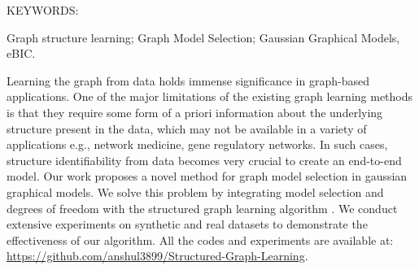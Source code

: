 
\abstract

\noindent KEYWORDS: \hspace*{0.5em} \parbox[t]{4.4in}{Graph structure learning; Graph Model Selection; Gaussian Graphical Models, eBIC.}

\vspace*{24pt}

\noindent Learning the graph from data holds immense significance in graph-based applications. One of the major limitations of the existing graph learning methods is that they require some form of a priori information about the underlying structure present in the data, which may not be available in a variety of applications e.g., network medicine, gene regulatory networks. In such cases, structure identifiability from data becomes very crucial to create an end-to-end model. Our work proposes a novel method for graph model selection in gaussian graphical models. We solve this problem by integrating model selection and degrees of freedom with the structured graph learning algorithm \citep{kumar2019structured}. We conduct extensive experiments on synthetic and real datasets to demonstrate the effectiveness of our algorithm. All the codes and experiments are available at: \href{https://github.com/anshul3899/Structured-Graph-Learning}{https://github.com/anshul3899/Structured-Graph-Learning}.